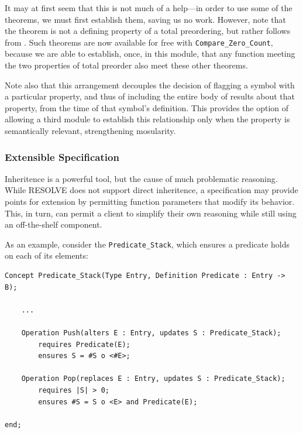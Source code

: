 It may at first seem that this is not much of a help---in order to use some of the theorems, we must first establish them, saving us no work.  However, note that the \texttt{} theorem is not a defining property of a total preordering, but rather follows from \texttt{\totalTheorem}.  Such theorems are now available for free with \texttt{Compare\_Zero\_Count}, because we are able to establish, once, in this module, that any function meeting the two properties of total preorder also meet these other theorems.

Note also that this arrangement decouples the decision of flagging a symbol with a particular property, and thus of including the entire body of results about that property, from the time of that symbol's definition.  This provides the option of allowing a third module to establish this relationship only when the property is semantically relevant, strengthening mosularity.

		\subsubsection{Extensible Specification\label{extensibleSpecification}}

Inheritence is a powerful tool, but the cause of much problematic reasoning\cite{vlissides1995design}.  While RESOLVE does not support direct inheritence, a specification may provide points for extension by permitting function parameters that modify its behavior.  This, in turn, can permit a client to simplify their own reasoning while still using an off-the-shelf component.

As an example, consider the \texttt{Predicate\_Stack}, which ensures a predicate holds on each of its elements:

\begin{lstlisting}
Concept Predicate_Stack(Type Entry, Definition Predicate : Entry -> B);

	...

	Operation Push(alters E : Entry, updates S : Predicate_Stack);
		requires Predicate(E);
		ensures S = #S o <#E>;

	Operation Pop(replaces E : Entry, updates S : Predicate_Stack);
		requires |S| > 0;
		ensures #S = S o <E> and Predicate(E);

end;
\end{lstlisting}

